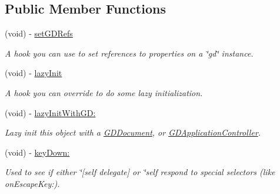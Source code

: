\subsection*{Public Member Functions}
\begin{DoxyCompactItemize}
\item 
\hypertarget{interface_g_d_base_window_a61dafd2fdc44f40feab4f517ec0443cd}{
(void) -\/ \hyperlink{interface_g_d_base_window_a61dafd2fdc44f40feab4f517ec0443cd}{setGDRefs}}
\label{interface_g_d_base_window_a61dafd2fdc44f40feab4f517ec0443cd}

\begin{DoxyCompactList}\small\item\em A hook you can use to set references to properties on a \char`\"{}gd\char`\"{} instance. \item\end{DoxyCompactList}\item 
(void) -\/ \hyperlink{interface_g_d_base_window_a6fb74f03aaa52cabb4f4492363299377}{lazyInit}
\begin{DoxyCompactList}\small\item\em A hook you can override to do some lazy initialization. \item\end{DoxyCompactList}\item 
(void) -\/ \hyperlink{interface_g_d_base_window_ab930dfe89ec95507a18c42195b2619cc}{lazyInitWithGD:}
\begin{DoxyCompactList}\small\item\em Lazy init this object with a \hyperlink{interface_g_d_document}{GDDocument}, or \hyperlink{interface_g_d_application_controller}{GDApplicationController}. \item\end{DoxyCompactList}\item 
(void) -\/ \hyperlink{interface_g_d_base_window_aca77773c0363f56af6e2586ae60c6d7d}{keyDown:}
\begin{DoxyCompactList}\small\item\em Used to see if either \char`\"{}\mbox{[}self delegate\mbox{]} or \char`\"{}self respond to special selectors (like onEscapeKey:). \item\end{DoxyCompactList}\end{DoxyCompactItemize}
